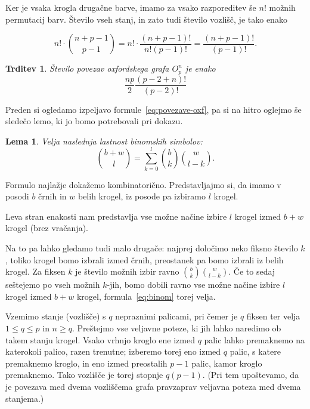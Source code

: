 \documentclass[12pt,a4paper]{amsart}
\theoremstyle{definition} %
\theoremstyle{plain} %
\newtheorem{lema}[definicija]{Lema}
\newtheorem{trditev}[definicija]{Trditev}
\begin{document}
    Ker je vsaka krogla drugačne barve, imamo za vsako razporeditev še $n!$ možnih permutacij barv. Število vseh stanj, in zato tudi število vozlišč, je tako enako
    
    \[ n! \cdot {n+p-1 \choose p-1} = n! \cdot \frac{(n+p-1)!}{n!(p-1)!} = \frac{(n+p-1)!}{(p-1)!}. \] \qedhere
\endproof

\begin{trditev}
    Število povezav oxfordskega grafa $O^n_p$ je enako
    \begin{equation}
        \label{eq:povezave-oxf}
        \frac{np}{2} \frac{(p-2+n)!}{(p-2)!}
    \end{equation}
    \label{trd:povezave-oxf}
\end{trditev}

Preden si ogledamo izpeljavo formule~\eqref{eq:povezave-oxf}, pa si na hitro oglejmo še sledečo lemo, ki jo bomo potrebovali pri dokazu.

\begin{lema}
    Velja naslednja lastnost binomskih simbolov:
    \begin{equation}
        \label{eq:binom}
        {b+w \choose l} = \sum_{k=0}^{l}{b \choose k}{w \choose l-k}.
    \end{equation}
\end{lema}

\proof
    Formulo najlažje dokažemo kombinatorično. Predstavljajmo si, da imamo v posodi $b$ črnih in $w$ belih krogel, iz posode pa izbiramo $l$ krogel.
    
    Leva stran enakosti nam predstavlja vse možne načine izbire $l$ krogel izmed $b+w$ krogel (brez vračanja). 
    
    Na to pa lahko gledamo tudi malo drugače: najprej določimo neko fiksno število $k$, toliko krogel bomo izbrali izmed črnih, preostanek pa bomo izbrali iz belih krogel. Za fiksen $k$ je število možnih izbir ravno ${b \choose k}{w \choose l-k}$. Če to sedaj seštejemo po vseh možnih $k$-jih, bomo dobili ravno vse možne načine izbire $l$ krogel izmed $b+w$ krogel, formula~\eqref{eq:binom} torej velja.
\endproof

    Vzemimo stanje (vozlišče) s $q$ nepraznimi palicami, pri čemer je $q$ fiksen ter velja $1 \leq q \leq p$ in $n \geq q$. Preštejmo vse veljavne poteze, ki jih lahko naredimo ob takem stanju krogel. Vsako vrhnjo kroglo ene izmed $q$ palic lahko premaknemo na katerokoli palico, razen trenutne; izberemo torej eno izmed $q$ palic, s katere premaknemo kroglo, in eno izmed preostalih $p-1$ palic, kamor kroglo premaknemo. Tako vozlišče je torej stopnje $q(p-1)$. (Pri tem upoštevamo, da je povezava med dvema vozliščema grafa pravzaprav veljavna poteza med dvema stanjema.)
    
\end{document}
